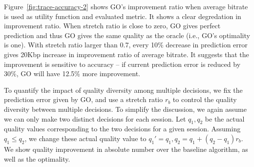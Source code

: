 Figure~\ref{fig:trace-accuracy-2} shows GO's improvement ratio when average bitrate is used as utility function and evaluated metric.
It shows a clear degredation in improvement ratio. When stretch ratio is close to zero, GO gives perfect prediction and thus GO gives the same quality as the oracle (i.e., GO's optimality is one). With stretch ratio larger than 0.7, every 10\% decrease in prediction error gives 20Kbp increase in improvement ratio of average bitrate. It suggests that the improvement is sensitive to accuracy -- if current prediction error is reduced by 30\%, GO will have 12.5\% more improvement. 



\label{subsec:impact-diversity}

To quantify the impact of quality diversity among multiple decisions,
we fix the prediction error given by GO, and use a stretch ratio $r_b$
to control the quality diversity between multiple decisions. To
simplify the discussion, we again assume we can only make two distinct
decisions for each session. Let $q_1, q_2$ be the actual quality
values corresponding to the two decisions for a given
session. Assuming $q_1\leq q_2$, we change these actual quality value
to $q_1'=q_1, q_2=q_1+(q_2-q_1)r_b$. We show quality improvement in
absolute number over the baseline algorithm, as well as the
optimality.


\begin{figure}[h!]
\centering
{}
\hspace{-0.6cm}

\label{fig:trace-diversity}
\end{figure}

